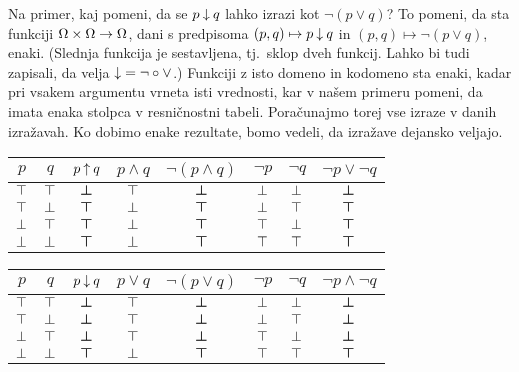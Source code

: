 		Na primer, kaj pomeni, da se $p \mathbin{\downarrow} q$ lahko izrazi kot $\lnot(p \lor q)$? To pomeni, da sta funkciji $\Omega \times \Omega \to \Omega$, dani s predpisoma $(p, q) \mapsto p \mathbin{\downarrow} q$ in $(p, q) \mapsto \lnot(p \lor q)$, enaki. (Slednja funkcija je sestavljena, tj.~sklop dveh funkcij. Lahko bi tudi zapisali, da velja $\mathbin{\downarrow} = \lnot \circ \lor$.) Funkciji z isto domeno in kodomeno sta enaki, kadar pri vsakem argumentu vrneta isti vrednosti, kar v našem primeru pomeni, da imata enaka stolpca v resničnostni tabeli. Poračunajmo torej vse izraze v danih izražavah. Ko dobimo enake rezultate, bomo vedeli, da izražave dejansko veljajo.
		
		\begin{center}
			\begin{tabular}{cc|cccccc}
				$p$ & $q$ & $p \mathbin{\uparrow} q$ & $p \land q$ & $\lnot(p \land q)$ & $\lnot{p}$ & $\lnot{q}$ & $\lnot{p} \lor \lnot{q}$ \\
				\hline
				$\top$ & $\top$ & $\bm{\bot}$ & $\top$ & $\bm{\bot}$ & $\bot$ & $\bot$ & $\bm{\bot}$ \\
				$\top$ & $\bot$ & $\bm{\top}$ & $\bot$ & $\bm{\top}$ & $\bot$ & $\top$ & $\bm{\top}$ \\
				$\bot$ & $\top$ & $\bm{\top}$ & $\bot$ & $\bm{\top}$ & $\top$ & $\bot$ & $\bm{\top}$ \\
				$\bot$ & $\bot$ & $\bm{\top}$ & $\bot$ & $\bm{\top}$ & $\top$ & $\top$ & $\bm{\top}$
			\end{tabular}
		\end{center}
		
		\begin{center}
			\begin{tabular}{cc|cccccc}
				$p$ & $q$ & $p \mathbin{\downarrow} q$ & $p \lor q$ & $\lnot(p \lor q)$ & $\lnot{p}$ & $\lnot{q}$ & $\lnot{p} \land \lnot{q}$ \\
				\hline
				$\top$ & $\top$ & $\bm{\bot}$ & $\top$ & $\bm{\bot}$ & $\bot$ & $\bot$ & $\bm{\bot}$ \\
				$\top$ & $\bot$ & $\bm{\bot}$ & $\top$ & $\bm{\bot}$ & $\bot$ & $\top$ & $\bm{\bot}$ \\
				$\bot$ & $\top$ & $\bm{\bot}$ & $\top$ & $\bm{\bot}$ & $\top$ & $\bot$ & $\bm{\bot}$ \\
				$\bot$ & $\bot$ & $\bm{\top}$ & $\bot$ & $\bm{\top}$ & $\top$ & $\top$ & $\bm{\top}$
			\end{tabular}
		\end{center}
		
